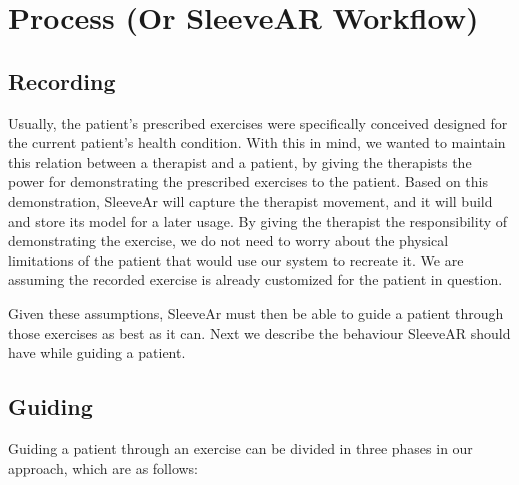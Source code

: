 




\section{Process (Or SleeveAR Workflow)}




\subsection{Recording}

Usually, the patient's prescribed exercises were specifically conceived designed for the current patient's health condition. 
With this in mind, we wanted to maintain this relation between a therapist and a patient, by giving the therapists the power for demonstrating the prescribed exercises to the patient. 
Based on this demonstration, SleeveAr will capture the therapist movement, and it will build and store its model for a later usage.
By giving the therapist the responsibility of demonstrating the exercise, we do not need to worry about the physical limitations of the patient that would use our system to recreate it. 
We are assuming the recorded exercise is already customized for the patient in question.

Given these assumptions, SleeveAr must then be able to guide a patient through those exercises as best as it can. Next we describe the behaviour SleeveAR should have while guiding a patient.


\subsection{Guiding}

Guiding a patient through an exercise can be divided in three phases in our approach, which are as follows:

